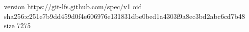 version https://git-lfs.github.com/spec/v1
oid sha256:c251e7b9dd459d0f4e606976e131831dbe0bed1a4303f9a8ec3bd2abc6cd7b48
size 7275
